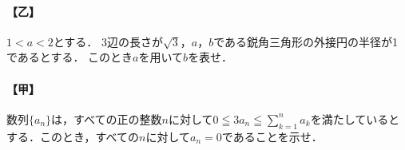 \documentclass[../../main.tex]{subfiles}
\begin{document}
\paragraph{【乙】}
$1<a<2$とする．
3辺の長さが$\sqrt{3}$，$a$，$b$である鋭角三角形の外接円の半径が1であるとする．
このとき$a$を用いて$b$を表せ．

\paragraph{【甲】}
数列$\{a_n\}$は，すべての正の整数$n$に対して$0 \leqq 3a_n \leqq \displaystyle\sum_{k=1}^n a_k$を満たしているとする．このとき，すべての$n$に対して$a_n = 0$であることを示せ．
\end{document}
